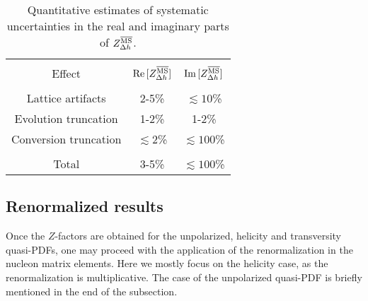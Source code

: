 \documentclass[12pt,tighten,nofootinbib,amssymb,floatfix]{article}
\newcommand{\MSb}{{\overline{\rm MS}}}
\renewcommand{\Re}{{\rm Re}\,}
\renewcommand{\Im}{{\rm Im}\,}
\begin{document}
{\small{
\begin{table}[!h]
\vspace*{0.25cm}
\begin{center}
\begin{tabular}{ccc}
\hline
\hline\\[-2ex]
Effect & $\Re[Z_{\Delta h}^\MSb]$   &  $\Im[Z_{\Delta h}^\MSb]$ \\[0.5ex]
\hline
\hline\\[-2ex]
Lattice artifacts & 2-5\% & $\lesssim10$\% \\[1ex]
Evolution truncation& 1-2\% & 1-2\% \\[1ex]
Conversion truncation& $\lesssim2$\% & $\lesssim100$\% \\[2ex]
\hline\\[-1.5ex]
Total & 3-5\% &  $\lesssim100$\% \\[1ex]
\hline
\hline
\end{tabular}
\vspace*{-0.4cm}
\begin{center}
\begin{minipage}{14cm}
\hspace*{3cm}
\caption{\small{Quantitative estimates of systematic uncertainties in the real and imaginary parts of $Z_{\Delta h}^\MSb$.}}
\label{tab2}
\end{minipage}
\end{center}
\end{center}
\end{table}
}}

\subsection{Renormalized results}
\label{sub3.2}

Once the $Z$-factors are obtained for the unpolarized, helicity and transversity quasi-PDFs, one may 
proceed with the application of the renormalization in the nucleon matrix elements. Here we mostly focus
on the helicity case, as the renormalization is multiplicative. The case of the unpolarized quasi-PDF is
briefly mentioned in the end of the subsection.
\end{document}
